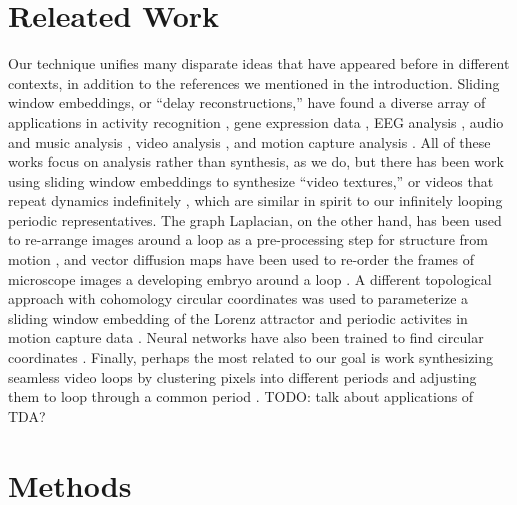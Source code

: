 \documentclass{article}
\begin{document}
\section{Releated Work}
Our technique unifies many disparate ideas that have appeared before in different contexts, in addition to the references we mentioned in the introduction.  Sliding window embeddings, or ``delay reconstructions,'' have found a diverse array of applications in activity recognition \cite{frank2010activity,venkataraman2016shape}, gene expression data \cite{perea2015sw1pers}, EEG analysis \cite{stam2005nonlinear, plesnik2014detection}, audio and music analysis \cite{herzel1994analysis,serra2009cross,bello2011measuring,traliemoebius}, video analysis \cite{schodl2000video, tralie2017quasi}, and motion capture analysis \cite{venkataraman2016shape}.  All of these works focus on analysis rather than synthesis, as we do, but there has been work using sliding window embeddings to synthesize ``video textures,'' or videos that repeat dynamics indefinitely \cite{schodl2000video}, which are similar in spirit to our infinitely looping periodic representatives.  The graph Laplacian, on the other hand, has been used to re-arrange images around a loop as a pre-processing step for structure from motion \cite{averbuch2015ringit}, and vector diffusion maps have been used to re-order the frames of microscope images a developing embryo around a loop \cite{dsilva2015diffusionvecordering}.  A different topological approach with cohomology circular coordinates\cite{de2011persistent} was used to parameterize a sliding window embedding of the Lorenz attractor \cite{de2012topological} and periodic activites in motion capture data \cite{vejdemo2015cohomological}.  Neural networks have also been trained to find circular coordinates \cite{levy2015live,anafi2017cyclops}.  Finally, perhaps the most related to our goal is work synthesizing seamless video loops by clustering pixels into different periods and adjusting them to loop through a common period \cite{Liao2013VideoLoops,Liao2015VideoLoops}.  TODO: talk about applications of TDA?



\section{Methods}
\label{sec:methods}
\end{document}
